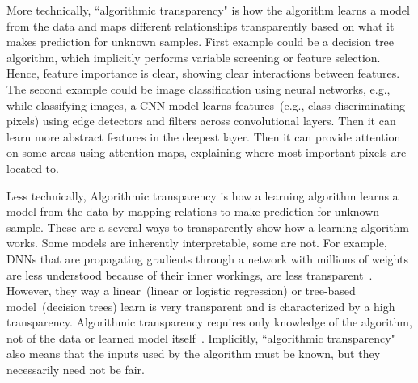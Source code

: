 \hspace*{3.5mm}More technically, ``algorithmic transparency" is how the algorithm learns a model from the data and maps different relationships transparently based on what it makes prediction for unknown samples. First example could be a decision tree algorithm, which implicitly performs variable screening or feature selection. Hence, feature importance is clear, showing clear interactions between features. The second example could be image classification using neural networks, e.g., while classifying images, a CNN model learns features~(e.g., class-discriminating pixels) using edge detectors and filters across convolutional layers. Then it can learn more abstract features in the deepest layer. Then it can provide attention on some areas using attention maps, explaining where most important pixels are located to.

\hspace*{3.5mm} Less technically, Algorithmic transparency is how a learning algorithm learns a model from the data by mapping relations to make prediction for unknown sample. These are a several ways to transparently show how a learning algorithm works. Some models are inherently interpretable, some are not. For example, DNNs that are propagating gradients through a network with millions of weights are less understood because of their inner workings, are less transparent~\cite{molnar2019interpretable}. However, they way a linear~(linear or logistic regression) or tree-based model~(decision trees) learn is very transparent and is characterized by a high transparency. Algorithmic transparency requires only knowledge of the algorithm, not of the data or learned model itself~\cite{molnar2019interpretable}. Implicitly, ``algorithmic transparency" also means that the inputs used by the algorithm must be known, but they necessarily need not be fair. 

